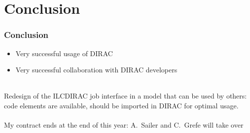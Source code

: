 \documentclass{beamer}
\begin{document}
\section{Conclusion}
\label{sec:conclusion}
\begin{frame}
  \frametitle{Conclusion}
  \begin{itemize}
  \item Very successful usage of DIRAC
  \item Very successful collaboration with DIRAC developers
  \end{itemize}
~\\
Redesign of the ILCDIRAC job interface in a model that can be used by
others: code elements are available, should be imported in DIRAC for
optimal usage.\\
~\\
My contract ends at the end of this year: A.~Sailer and C.~Grefe will
take over
\end{frame}
\end{document}
